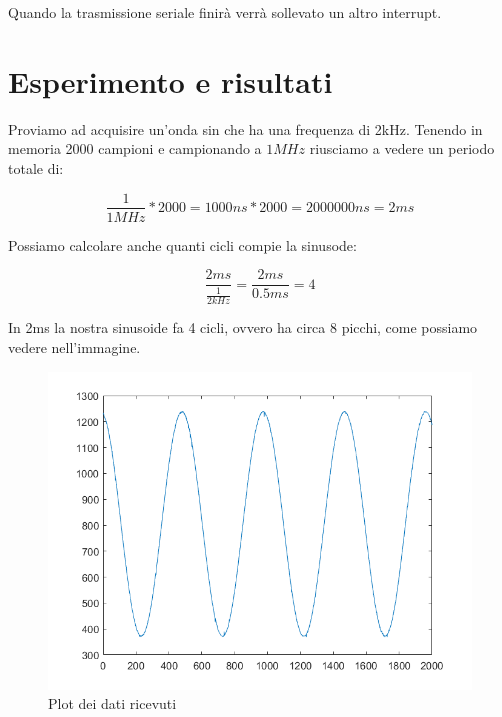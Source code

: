 Quando la trasmissione seriale finirà verrà sollevato un altro interrupt.

\section*{Esperimento e risultati}
Proviamo ad acquisire un'onda sin che ha una frequenza di 2kHz.
Tenendo in memoria 2000 campioni e campionando a $1 \si{MHz}$ riusciamo a vedere un periodo totale di: 

\begin{displaymath}
 \frac {1}{1 \si{MHz}} * 2000 = 1000 \si{ns} * 2000 = 2000000 \si{ns} = 2 \si{ms}
\end{displaymath}

Possiamo calcolare anche quanti cicli compie la sinusode:

\begin{displaymath}
 \frac{2 \si{ms}}{\frac {1}{2 \si{kHz}}}  = \frac{2 \si{ms}}{0.5\si{ms}} = 4
\end{displaymath}

In 2ms la nostra sinusoide fa 4 cicli, ovvero ha circa 8 picchi, come possiamo vedere nell'immagine.

\begin{figure}[H]
\centering
\includegraphics[width=\textwidth]{assets/exp6/onda_2kHz_8picchi.png}
\caption{Plot dei dati ricevuti}
\end{figure}